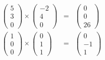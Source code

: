 \documentclass[a4paper]{article}
\begin{document}
\subsection{}
  \begin{align*}
    \begin{pmatrix}
      5 \\ 3 \\ 0
    \end{pmatrix}
    \times
    \begin{pmatrix}
      -2 \\ 4 \\ 0
    \end{pmatrix}
    &=&
    \begin{pmatrix}
      0 \\ 0 \\ 26
    \end{pmatrix}
    \\[1em]
    \begin{pmatrix}
      1 \\ 0 \\ 0
    \end{pmatrix}
    \times
    \begin{pmatrix}
      0 \\ 1 \\ 1
    \end{pmatrix}
    &=&
    \begin{pmatrix}
      0 \\ -1 \\ 1
    \end{pmatrix}
  \end{align*}
\end{document}
